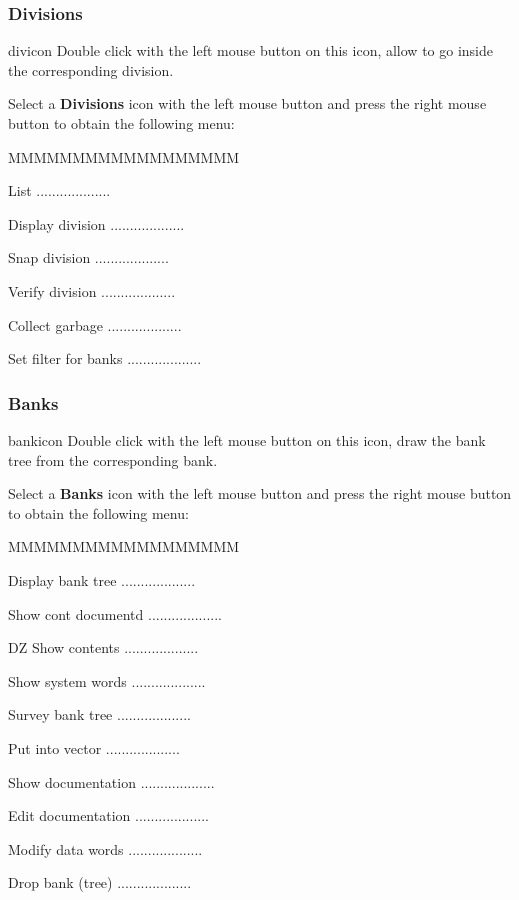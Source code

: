 \subsubsection{\ZEBRA{} Divisions}
\begin{ICON}{divicon}
Double click with the left mouse button on this icon, allow to go inside the
corresponding \ZEBRA{} division.
\end{ICON}

Select a {\bf \ZEBRA{} Divisions} icon with the left mouse button and press
the right mouse button to obtain the following menu:


\begin{DLsf}{MMMMMMMMMMMMMMMMMM}
\item[List]                      ...................
\item[Display division]          ...................
\item[Snap division]             ...................
\item[Verify division]           ...................
\item[Collect garbage]           ...................
\item[Set filter for banks]      ...................
\end{DLsf}



\subsubsection{\ZEBRA{} Banks}
\begin{ICON}{bankicon}
Double click with the left mouse button on this icon, draw the bank tree from
the corresponding \ZEBRA{} bank.
\end{ICON}

Select a {\bf \ZEBRA{} Banks} icon with the left mouse button and press
the right mouse button to obtain the following menu:


\begin{DLsf}{MMMMMMMMMMMMMMMMMM}
\item[Display bank tree]         ...................
\item[Show cont documentd]       ...................
\item[DZ Show contents]          ...................
\item[Show system words]         ...................
\item[Survey bank tree]          ...................
\item[Put into vector]           ...................
\item[Show documentation]        ...................
\item[Edit documentation]        ...................
\item[Modify data words]         ...................
\item[Drop bank (tree)]          ...................
\end{DLsf}


